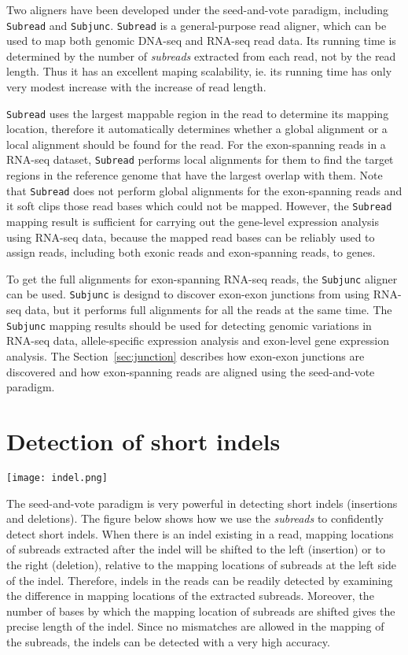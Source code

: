 \documentclass[12pt]{report}
\newcommand{\code}[1]{{\small\texttt{#1}}}
\begin{document}
Two aligners have been developed under the seed-and-vote paradigm, including \code{Subread} and \code{Subjunc}.
\code{Subread} is a general-purpose read aligner, which can be used to map both genomic DNA-seq and RNA-seq read data.
Its running time is determined by the number of \emph{subreads} extracted from each read, not by the read length.
Thus it has an excellent maping scalability, ie. its running time has only very modest increase with the increase of read length.

\code{Subread} uses the largest mappable region in the read to determine its mapping location, therefore it automatically determines whether a global alignment or a local alignment should be found for the read.
For the exon-spanning reads in a RNA-seq dataset, \code{Subread} performs local alignments for them to find the target regions in the reference genome that have the largest overlap with them.
Note that \code{Subread} does not perform global alignments for the exon-spanning reads and it soft clips those read bases which could not be mapped.
However, the \code{Subread} mapping result is sufficient for carrying out the gene-level expression analysis using RNA-seq data, because the mapped read bases can be reliably used to assign reads, including both exonic reads and exon-spanning reads, to genes.

To get the full alignments for exon-spanning RNA-seq reads, the \code{Subjunc} aligner can be used.
\code{Subjunc} is designd to discover exon-exon junctions from using RNA-seq data, but it performs full alignments for all the reads at the same time. 
The \code{Subjunc} mapping results should be used for detecting genomic variations in RNA-seq data, allele-specific expression analysis and exon-level gene expression analysis.
The Section~\ref{sec:junction} describes how exon-exon junctions are discovered and how exon-spanning reads are aligned using the seed-and-vote paradigm.

\section{Detection of short indels}

\begin{center}
\texttt{[image: indel.png]}
\end{center}

The seed-and-vote paradigm is very powerful in detecting short indels (insertions and deletions).
The figure below shows how we use the \emph{subreads} to confidently detect short indels.
When there is an indel existing in a read, mapping locations of subreads extracted after the indel will be shifted to the left (insertion) or to the right (deletion), relative to the mapping locations of subreads at the left side of the indel.
Therefore, indels in the reads can be readily detected by examining the difference in mapping locations of the extracted subreads.
Moreover, the number of bases by which the mapping location of subreads are shifted gives the precise length of the indel.
Since no mismatches are allowed in the mapping of the subreads, the indels can be detected with a very high accuracy.
\end{document}
